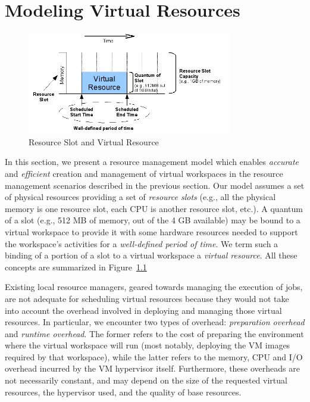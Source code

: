 \documentclass[singlespace]{ccw_chithesis}
\begin{document}
\chapter{Modeling Virtual Resources}
\label{cha:virtualresources}

\begin{figure}
  \begin{center}
    \includegraphics[width=0.8\textwidth]{figures/resourceslot.png}
    \caption{Resource Slot and Virtual Resource}
	\label{fig:resourceslot}
  \end{center}
\end{figure}

In this section, we present a resource management model which enables \emph{accurate} and \emph{efficient} creation and management of virtual workspaces in the resource management scenarios described in the previous section. Our model assumes a set of physical resources providing a set of \emph{resource slots} (e.g., all the physical memory is one resource slot, each CPU is another resource slot, etc.). A quantum of a slot (e.g., 512 MB of memory, out of the 4 GB available) may be bound to a virtual workspace to provide it with some hardware resources needed to support the workspace's activities for a \emph{well{}-defined period of time}. We term such a binding of a portion of a slot to a virtual workspace a \emph{virtual resource}. All these concepts are summarized in Figure~\ref{fig:resourceslot}

Existing local resource managers, geared towards managing the execution of jobs, are not adequate for scheduling virtual resources because they would not take into account the overhead involved in deploying and managing those virtual resources. In particular, we encounter two types of overhead: \emph{preparation overhead} and \emph{runtime overhead}. The former refers to the cost of preparing the environment where the virtual workspace will run (most notably, deploying the VM images required by that workspace), while the latter refers to the memory, CPU and I/O overhead incurred by the VM hypervisor itself. Furthermore, these overheads are not necessarily constant, and may depend on the size of the requested virtual resources, the hypervisor used, and the quality of base resources.
\end{document}
